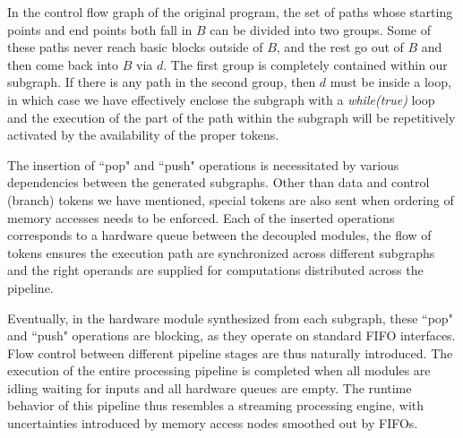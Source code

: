In the control flow graph of the original program, the set of paths whose starting points and end points both fall in $B$ can be divided into
two groups. Some of these paths never reach basic blocks outside of $B$, and the rest go out of $B$ and then come back into $B$ via $d$. 
The first group
is completely contained within our subgraph.  If there is any path in the second group, then $d$ must be inside a loop, in which case we have effectively enclose the subgraph with a \textit{while(true)} loop and the execution of the part
of the path within the subgraph
will be repetitively activated by the availability of the proper tokens.

The insertion of %
``pop" and ``push"
operations is necessitated by various
dependencies between the generated subgraphs. Other than data and control (branch) tokens we have mentioned, special tokens are also sent when ordering
of memory accesses needs to be enforced. Each of the inserted operations corresponds to a hardware queue between the decoupled modules, the flow of
tokens ensures the execution path are synchronized across different subgraphs
and the right operands are supplied for computations distributed across the
pipeline.

Eventually, in the hardware module synthesized from each subgraph, these ``pop" and ``push" operations %
are blocking, as they operate on standard FIFO interfaces. Flow control between different pipeline stages are thus naturally introduced. The execution of the entire processing pipeline is completed when all modules are idling waiting for inputs and all hardware queues are empty. The runtime behavior of this pipeline thus resembles a streaming processing engine, with uncertainties introduced by memory access nodes smoothed out by FIFOs.



